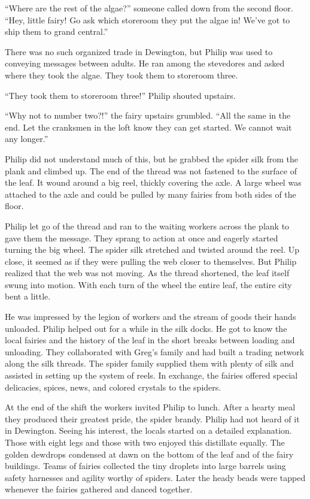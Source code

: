 \documentclass[10pt, draft]{memoir}
\begin{document}
``Where are the rest of the algae?'' someone called down from the second floor.
``Hey, little fairy! Go ask which storeroom they put the algae in! We've got to
ship them to grand central.''

There was no such organized trade in Dewington, but Philip was used to
conveying messages between adults. He ran among the stevedores and asked where
they took the algae. They took them to storeroom three.

``They took them to storeroom three!'' Philip shouted upstairs.

``Why not to number two?!'' the fairy upstairs grumbled. ``All the same in the
end. Let the cranksmen in the loft know they can get started. We cannot wait
any longer.''

Philip did not understand much of this, but he grabbed the spider silk from the
plank and climbed up. The end of the thread was not fastened to the surface of
the leaf. It wound around a big reel, thickly covering the axle. A large wheel
was attached to the axle and could be pulled by many fairies from both sides of
the floor.

Philip let go of the thread and ran to the waiting workers across the plank to
gave them the message. They sprang to action at once and eagerly started
turning the big wheel. The spider silk stretched and twisted around the reel.
Up close, it seemed as if they were pulling the web closer to themselves. But
Philip realized that the web was not moving. As the thread shortened, the leaf
itself swung into motion. With each turn of the wheel the entire leaf, the
entire city bent a little.

He was impressed by the legion of workers and the stream of goods their hands
unloaded. Philip helped out for a while in the silk docks. He got to know the
local fairies and the history of the leaf in the short breaks between loading
and unloading. They collaborated with Greg's family and had built a trading
network along the silk threads. The spider family supplied them with plenty of
silk and assisted in setting up the system of reels. In exchange, the fairies
offered special delicacies, spices, news, and colored crystals to the spiders.

At the end of the shift the workers invited Philip to lunch. After a hearty
meal they produced their greatest pride, the spider brandy. Philip had not
heard of it in Dewington. Seeing his interest, the locals started on a detailed
explanation. Those with eight legs and those with two enjoyed this distillate
equally. The golden dewdrops condensed at dawn on the bottom of the leaf and of
the fairy buildings. Teams of fairies collected the tiny droplets into large
barrels using safety harnesses and agility worthy of spiders. Later the heady
beads were tapped whenever the fairies gathered and danced together.
\end{document}
